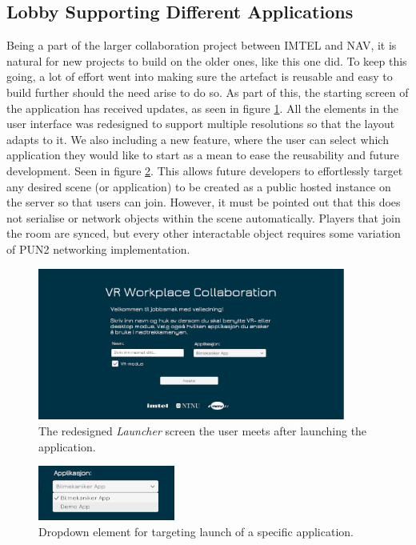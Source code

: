 \subsection{Lobby Supporting Different Applications}
\label{section:lobbySystem}
Being a part of the larger collaboration project between IMTEL and NAV, it is natural for new projects to build on the older ones, like this one did. To keep this going, a lot of effort went into making sure the artefact is reusable and easy to build further should the need arise to do so. As part of this, the starting screen of the application has received updates, as seen in figure \ref{fig:phase3_lobby1}. All the elements in the user interface was redesigned to support multiple resolutions so that the layout adapts to it.  
We also including a new feature, where the user can select which application they would like to start as a mean to ease the reusability and future development. Seen in figure \ref{fig:phase3_dropwdown}. This allows future developers to effortlessly target any desired scene (or application) to be created as a public hosted instance on the server so that users can join. 
However, it must be pointed out that this does not serialise or network objects within the scene automatically. Players that join the room are synced, but every other interactable object requires some variation of PUN2 networking implementation. 


\begin{figure}[H]
  \centering
   \captionsetup{width=.9\linewidth}
    \includegraphics[width=0.9\textwidth]{fig/phase_3/implementation/Lobby1.PNG}
 \caption{The redesigned \textit{Launcher} screen the user meets after launching the application.}
\label{fig:phase3_lobby1}
\end{figure}



\begin{figure}[H]
  \centering
   \captionsetup{width=.4\linewidth}
    \includegraphics[width=0.4\textwidth]{fig/phase_3/implementation/LauncherDropdown1.png}
 \caption{Dropdown element for targeting launch of a specific application. }
\label{fig:phase3_dropwdown}
\end{figure}

